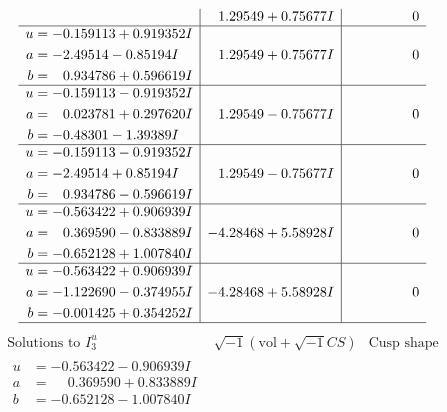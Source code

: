 \documentclass[1p]{elsarticle_modified}
\theoremstyle{definition}
\newcommand{\I}{\sqrt{-1}}
\begin{document}
$$\begin{array}{c|c|c}
 & \phantom{-}1.29549 + 0.75677 I & \phantom{-0.000000 } 0 \\ \hline\begin{aligned}
u &= -0.159113 + 0.919352 I \\
a &= -2.49514 - 0.85194 I \\
b &= \phantom{-}0.934786 + 0.596619 I\end{aligned}
 & \phantom{-}1.29549 + 0.75677 I & \phantom{-0.000000 } 0 \\ \hline\begin{aligned}
u &= -0.159113 - 0.919352 I \\
a &= \phantom{-}0.023781 + 0.297620 I \\
b &= -0.48301 - 1.39389 I\end{aligned}
 & \phantom{-}1.29549 - 0.75677 I & \phantom{-0.000000 } 0 \\ \hline\begin{aligned}
u &= -0.159113 - 0.919352 I \\
a &= -2.49514 + 0.85194 I \\
b &= \phantom{-}0.934786 - 0.596619 I\end{aligned}
 & \phantom{-}1.29549 - 0.75677 I & \phantom{-0.000000 } 0 \\ \hline\begin{aligned}
u &= -0.563422 + 0.906939 I \\
a &= \phantom{-}0.369590 - 0.833889 I \\
b &= -0.652128 + 1.007840 I\end{aligned}
 & -4.28468 + 5.58928 I & \phantom{-0.000000 } 0 \\ \hline\begin{aligned}
u &= -0.563422 + 0.906939 I \\
a &= -1.122690 - 0.374955 I \\
b &= -0.001425 + 0.354252 I\end{aligned}
 & -4.28468 + 5.58928 I & \phantom{-0.000000 } 0\\
 \hline 
 \end{array}$$\newpage$$\begin{array}{c|c|c}  
\text{Solutions to }I^u_{3}& \I (\text{vol} + \sqrt{-1}CS) & \text{Cusp shape}\\
 \hline 
\begin{aligned}
u &= -0.563422 - 0.906939 I \\
a &= \phantom{-}0.369590 + 0.833889 I \\
b &= -0.652128 - 1.007840 I\end{aligned}

\end{array}$$
\end{document}
